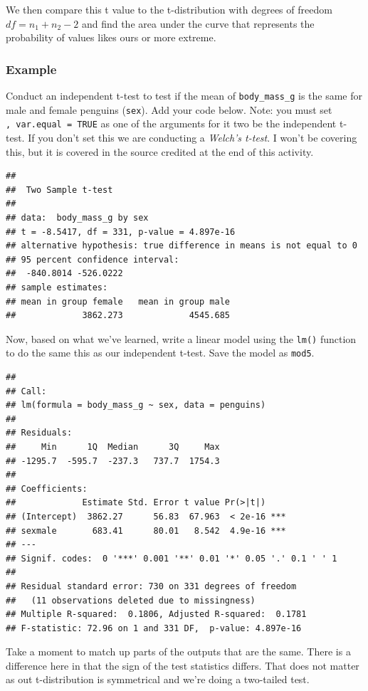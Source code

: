 \documentclass[
]{book}
\begin{document}
We then compare this t value to the t-distribution with degrees of freedom \(df = n_1 + n_2 - 2\) and find the area under the curve that represents the probability of values likes ours or more extreme.

\hypertarget{example-2}{%
\subsubsection{Example}\label{example-2}}

Conduct an independent t-test to test if the mean of \texttt{body\_mass\_g} is the same for male and female penguins (\texttt{sex}). Add your code below. Note: you must set \texttt{,\ var.equal\ =\ TRUE} as one of the arguments for it two be the independent t-test. If you don't set this we are conducting a \emph{Welch's t-test}. I won't be covering this, but it is covered in the source credited at the end of this activity.

\begin{verbatim}
## 
##  Two Sample t-test
## 
## data:  body_mass_g by sex
## t = -8.5417, df = 331, p-value = 4.897e-16
## alternative hypothesis: true difference in means is not equal to 0
## 95 percent confidence interval:
##  -840.8014 -526.0222
## sample estimates:
## mean in group female   mean in group male 
##             3862.273             4545.685
\end{verbatim}

Now, based on what we've learned, write a linear model using the \texttt{lm()} function to do the same this as our independent t-test. Save the model as \texttt{mod5}.

\begin{verbatim}
## 
## Call:
## lm(formula = body_mass_g ~ sex, data = penguins)
## 
## Residuals:
##     Min      1Q  Median      3Q     Max 
## -1295.7  -595.7  -237.3   737.7  1754.3 
## 
## Coefficients:
##             Estimate Std. Error t value Pr(>|t|)    
## (Intercept)  3862.27      56.83  67.963  < 2e-16 ***
## sexmale       683.41      80.01   8.542  4.9e-16 ***
## ---
## Signif. codes:  0 '***' 0.001 '**' 0.01 '*' 0.05 '.' 0.1 ' ' 1
## 
## Residual standard error: 730 on 331 degrees of freedom
##   (11 observations deleted due to missingness)
## Multiple R-squared:  0.1806, Adjusted R-squared:  0.1781 
## F-statistic: 72.96 on 1 and 331 DF,  p-value: 4.897e-16
\end{verbatim}

Take a moment to match up parts of the outputs that are the same. There is a difference here in that the sign of the test statistics differs. That does not matter as out t-distribution is symmetrical and we're doing a two-tailed test.
\end{document}
